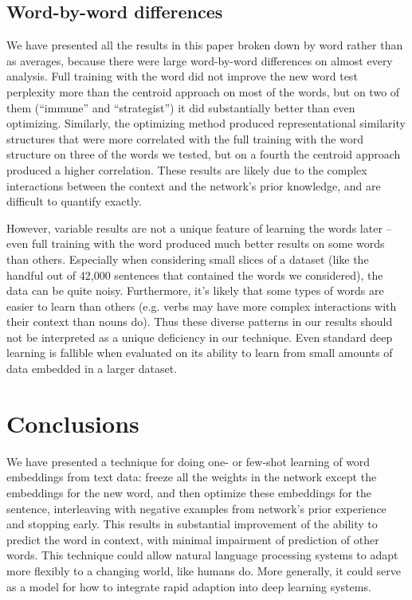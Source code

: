 \documentclass{article}
\begin{document}
\subsection{Word-by-word differences}
We have presented all the results in this paper broken down by word rather than as averages, because there were large word-by-word differences on almost every analysis. Full training with the word did not improve the new word test perplexity more than the centroid approach on most of the words, but on two of them (``immune'' and ``strategist'') it did substantially better than even optimizing. Similarly, the optimizing method produced representational similarity structures that were more correlated with the full training with the word structure on three of the words we tested, but on a fourth the centroid approach produced a higher correlation. These results are likely due to the complex interactions between the context and the network's prior knowledge, and are difficult to quantify exactly. \par
However, variable results are not a unique feature of learning the words later -- even full training with the word produced much better results on some words than others. Especially when considering small slices of a dataset (like the handful out of 42,000 sentences that contained the words we considered), the data can be quite noisy. Furthermore, it's likely that some types of words are easier to learn than others (e.g. verbs may have more complex interactions with their context than nouns do). Thus these diverse patterns in our results should not be interpreted as a unique deficiency in our technique. Even standard deep learning is fallible when evaluated on its ability to learn from small amounts of data embedded in a larger dataset. \par
\section{Conclusions}
We have presented a technique for doing one- or few-shot learning of word embeddings from text data: freeze all the weights in the network except the embeddings for the new word, and then optimize these embeddings for the sentence, interleaving with negative examples from network's prior experience and stopping early. This results in substantial improvement of the ability to predict the word in context, with minimal impairment of prediction of other words. This technique could allow natural language processing systems to adapt more flexibly to a changing world, like humans do. More generally, it could serve as a model for how to integrate rapid adaption into deep learning systems.  
\end{document}
